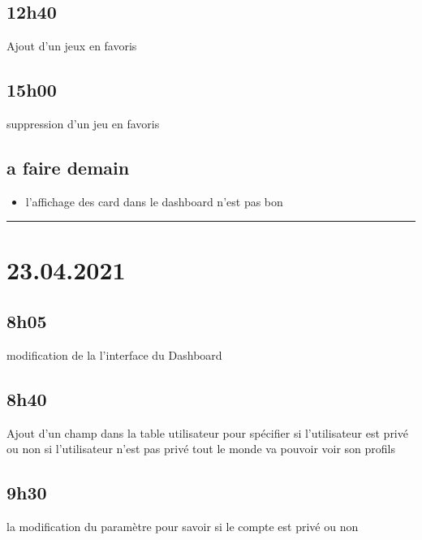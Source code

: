 \documentclass[a4paper,12pt,french]{sphinxmanual}
\begin{document}
\subsection{12h40}
\label{\detokenize{logbook:id17}}
\sphinxAtStartPar
Ajout d’un jeux en favoris


\subsection{15h00}
\label{\detokenize{logbook:id18}}
\sphinxAtStartPar
suppression d’un jeu en favoris


\subsection{a faire demain}
\label{\detokenize{logbook:a-faire-demain}}\begin{itemize}
\item {} 
\sphinxAtStartPar
l’affichage des card dans le dashboard n’est pas bon

\end{itemize}


\bigskip\hrule\bigskip



\section{23.04.2021}
\label{\detokenize{logbook:id19}}

\subsection{8h05}
\label{\detokenize{logbook:id20}}
\sphinxAtStartPar
modification de la l’interface du Dashboard


\subsection{8h40}
\label{\detokenize{logbook:id21}}
\sphinxAtStartPar
Ajout d’un champ dans la table utilisateur pour spécifier si l’utilisateur est privé ou non
si l’utilisateur n’est pas privé tout le monde va pouvoir voir son profils


\subsection{9h30}
\label{\detokenize{logbook:id22}}
\sphinxAtStartPar
la modification du paramètre pour savoir si le compte est privé ou non
\end{document}
